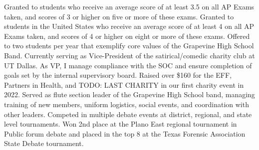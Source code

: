 \documentclass[
    10pt,
    A4,
    english,
    draft = false,
    twoside = false,
]{article}
\begin{document}
        {Granted to students who receive an average score of at least 3.5 on
        all AP Exams taken, and scores of 3 or higher on five or more of these
        exams.}
        {Granted to students in the United States who receive an average score
        of at least 4 on all AP Exams taken, and scores of 4 or higher on eight
        or more of these exams.}
        {Offered to two students per year that exemplify core values of the
        Grapevine High School Band.}
        {Currently serving as Vice-President of the satirical/comedic charity
        club at UT Dallas. As VP, I manage compliance with the SOC and ensure
        completion of goals set by the internal supervisory board. Raised over
        \$160 for the EFF, Partners in Health, and TODO: LAST CHARITY in our
        first charity event in 2022.}
        {Served as flute section leader of the Grapevine High School band,
        managing training of new members, uniform logistics, social events, and
        coordination with other leaders.}
        {Competed in multiple debate events at district, regional, and state
        level tournaments. Won 2nd place at the Plano East regional tournament
        in Public forum debate and placed in the top 8 at the Texas Forensic
        Association State Debate tournament.}
\end{document}
